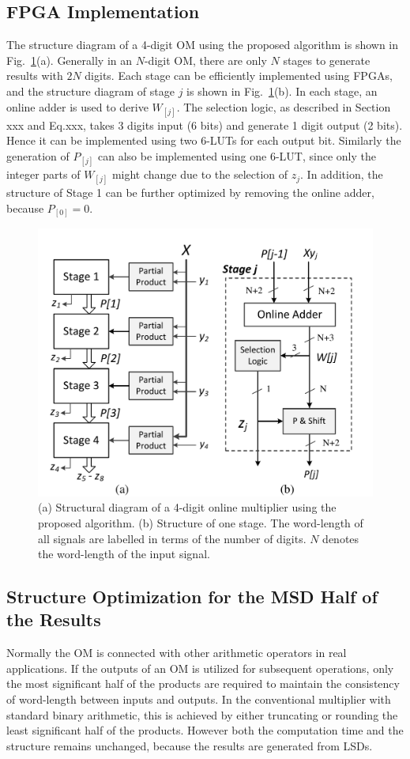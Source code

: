 \documentclass[conference]{IEEEtran}
\begin{document}
\subsection{FPGA Implementation}
The structure diagram of a 4-digit OM using the proposed algorithm is shown in Fig.~\ref{Fig:PMStructure}(a). Generally in an $N$-digit OM, there are only $N$ stages to generate results with $2N$ digits. Each stage can be efficiently implemented using FPGAs, and the structure diagram of stage $j$ is shown in Fig.~\ref{Fig:PMStructure}(b). In each stage, an online adder is used to derive $W_{[j]}$. The selection logic, as described in Section xxx and Eq.xxx, takes 3 digits input (6 bits) and generate 1 digit output (2 bits). Hence it can be implemented using two 6-LUTs for each output bit. Similarly the generation of $P_{[j]}$ can also be implemented using one 6-LUT, since only the integer parts of $W_{[j]}$ might change due to the selection of $z_j$. In addition, the structure of Stage 1 can be further optimized by removing the online adder, because $P_{[0]}=0$.

\begin{figure}[tbp]
	\centering
	\includegraphics[width=.5\textwidth]{./Figures/ParallelMult_Structure.pdf}
	\caption{(a) Structural diagram of a 4-digit online multiplier using the proposed algorithm. (b) Structure of one stage. The word-length of all signals are labelled in terms of the number of digits. $N$ denotes the word-length of the input signal.}
	\label{Fig:PMStructure}
\end{figure}

\subsection{Structure Optimization for the MSD Half of the Results}

Normally the OM is connected with other arithmetic operators in real applications. If the outputs of an OM is utilized for subsequent operations, only the most significant half of the products are required to maintain the consistency of word-length between inputs and outputs. In the conventional multiplier with standard binary arithmetic, this is achieved by either truncating or rounding the least significant half of the products. However both the computation time and the structure remains unchanged, because the results are generated from LSDs. 
\end{document}
